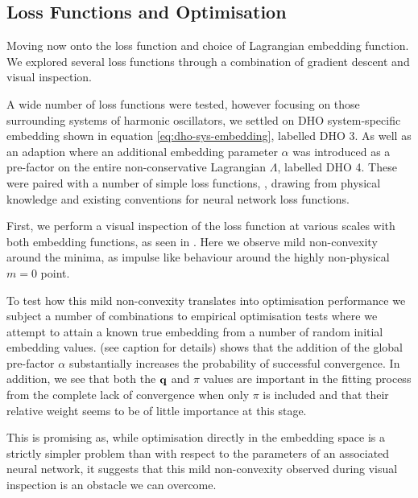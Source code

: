 \subsection{Loss Functions and Optimisation}
\label{sec:res-lf}

Moving now onto the loss function and choice of Lagrangian embedding function. We explored several loss functions through a combination of gradient descent and visual inspection.

A wide number of loss functions were tested, however focusing on those surrounding systems of harmonic oscillators, we settled on DHO system-specific embedding shown in equation \eqref{eq:dho-sys-embedding}, labelled DHO 3.
As well as an adaption where an additional embedding parameter $\alpha$ was introduced as a pre-factor on the entire non-conservative Lagrangian $\Lambda$, labelled DHO 4. 
These were paired with a number of simple loss functions, , drawing from physical knowledge and existing conventions for neural network loss functions.

First, we perform a visual inspection of the  loss function at various scales with both embedding functions, as seen in . Here we observe mild non-convexity around the minima, as impulse like behaviour around the highly non-physical $m = 0$ point.

To test how this mild non-convexity translates into optimisation performance we subject a number of combinations to empirical optimisation tests where we attempt to attain a known true embedding from a number of random initial embedding values.  (see caption for details) shows that the addition of the global pre-factor $\alpha$ substantially increases the probability of successful convergence.  In addition, we see that both the $\vb{q}$ and $\pi$ values are important in the fitting process from the complete lack of convergence when only $\pi$ is included and that their relative weight seems to be of little importance at this stage.

This is promising as, while optimisation directly in the embedding space is a strictly simpler problem than with respect to the parameters of an associated neural network, it suggests that this mild non-convexity observed during visual inspection is an obstacle we can overcome.

